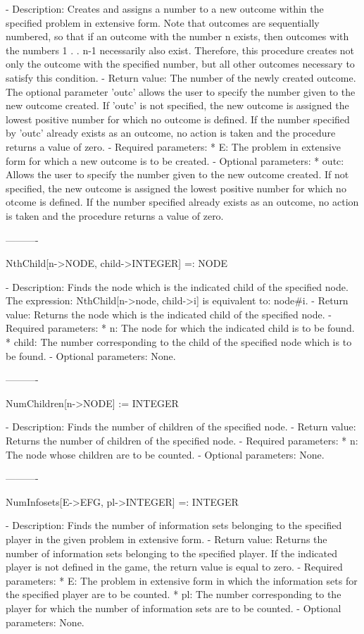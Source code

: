    -	Description:  Creates and assigns a number to a new outcome within the
	specified problem in extensive form.  Note that outcomes are 
	sequentially numbered, so that if an outcome with the number n exists,
	then outcomes with the numbers 1 . . n-1 necessarily also exist.
	Therefore, this procedure creates not only the outcome with the 
	specified number, but all other outcomes necessary to satisfy this 
	condition.
   -	Return value:  The number of the newly created outcome.  The optional 
	parameter 'outc' allows the user to specify the number given to the new
	outcome created.  If 'outc' is not specified, the new outcome is 
	assigned the lowest positive number for which no outcome is defined.  
	If the number specified by 'outc' already exists as an outcome, no 
	action is taken and the procedure returns a value of zero.
   -	Required parameters:
	  *  E:  The problem in extensive form for which a new outcome is to
	     be created.
   -	Optional parameters:
	  *  outc:  Allows the user to specify the number given to the new 
	     outcome created.  If not specified, the new outcome is assigned
	     the lowest positive number for which no otcome is defined.  If the
	     number specified already exists as an outcome, no action is taken
	     and the procedure returns a value of zero.

----------

NthChild[n->NODE, child->INTEGER] =: NODE

   -	Description:  Finds the node which is the indicated child of the 
	specified node.  The expression:  NthChild[n->node, child->i] is 
	equivalent to:  node#i.
   -	Return value:  Returns the node which is the indicated child of the
	specified node.
   -	Required parameters:
	  *  n:  The node for which the indicated child is to be found.
	  *  child:  The number corresponding to the child of the specified 
		node which is to be found.
   -	Optional parameters:  None.

----------

NumChildren[n->NODE] := INTEGER

   -	Description:  Finds the number of children of the specified node.
   -	Return value:  Returns the number of children of the specified node.
   -	Required parameters:
	  *  n:  The node whose children are to be counted.
   -	Optional parameters:  None.

----------

NumInfosets[E->EFG, pl->INTEGER] =: INTEGER

   -	Description:  Finds the number of information sets belonging to the
	specified player in the given problem in extensive form.
   -	Return value:  Returns the number of information sets belonging to
	the specified player.  If the indicated player is not defined in the 
	game, the return value is equal to zero.
   -	Required parameters:
	  *  E:  The problem in extensive form in which the information sets
		for the specified player are to be counted.
	  *  pl:  The number corresponding to the player for which the number 
		of information sets are to be counted.
   -	Optional parameters:  None.


